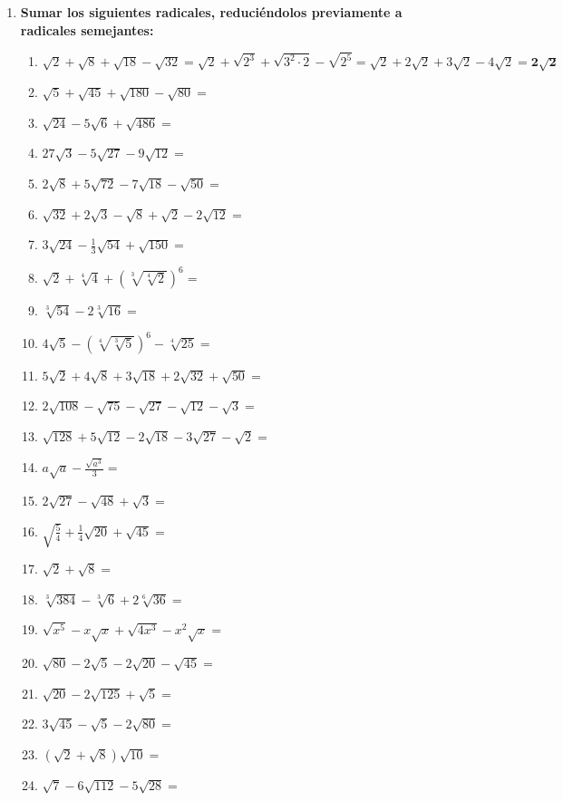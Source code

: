 \documentclass[10pt, a4paper]{article}
\begin{document}
\begin{enumerate}
    \item \textbf{Sumar los siguientes radicales, reduciéndolos previamente a radicales semejantes:}
    \begin{enumerate}[label=\alph*)]
        \item $\sqrt{2} + \sqrt{8} + \sqrt{18} - \sqrt{32} = \sqrt{2} + \sqrt{2^3} + \sqrt{3^2 \cdot 2} - \sqrt{2^5} = \sqrt{2} + 2\sqrt{2} + 3\sqrt{2} - 4\sqrt{2} = \mathbf{2\sqrt{2}}$
        \item $\sqrt{5} + \sqrt{45} + \sqrt{180} - \sqrt{80} =$
        \item $\sqrt{24} - 5\sqrt{6} + \sqrt{486} =$
        \item $27\sqrt{3} - 5\sqrt{27} - 9\sqrt{12} =$
        \item $2\sqrt{8} + 5\sqrt{72} - 7\sqrt{18} - \sqrt{50} =$
        \item $\sqrt{32} + 2\sqrt{3} - \sqrt{8} + \sqrt{2} - 2\sqrt{12} =$
        \item $3\sqrt{24} - \frac{1}{3}\sqrt{54} + \sqrt{150} =$
        \item $\sqrt{2} + \sqrt[4]{4} + (\sqrt[3]{\sqrt[4]{2}})^6 =$
        \item $\sqrt[3]{54} - 2\sqrt[3]{16} =$
        \item $4\sqrt{5} - (\sqrt[4]{\sqrt[3]{5}})^6 - \sqrt[4]{25} =$
        \item $5\sqrt{2} + 4\sqrt{8} + 3\sqrt{18} + 2\sqrt{32} + \sqrt{50} =$
        \item $2\sqrt{108} - \sqrt{75} - \sqrt{27} - \sqrt{12} - \sqrt{3} =$
        \item $\sqrt{128} + 5\sqrt{12} - 2\sqrt{18} - 3\sqrt{27} - \sqrt{2} =$
        \item $a\sqrt{a} - \frac{\sqrt{a^3}}{3} =$
        \item $2\sqrt{27} - \sqrt{48} + \sqrt{3} =$
        \item $\sqrt{\frac{5}{4}} + \frac{1}{4}\sqrt{20} + \sqrt{45} =$
        \item $\sqrt{2} + \sqrt{8} =$
        \item $\sqrt[3]{384} - \sqrt[3]{6} + 2\sqrt[6]{36} =$
        \item $\sqrt{x^5} - x\sqrt{x} + \sqrt{4x^3} - x^2 \sqrt{x} =$
        \item $\sqrt{80} - 2\sqrt{5} - 2\sqrt{20} - \sqrt{45} =$
        \item $\sqrt{20} - 2\sqrt{125} + \sqrt{5} =$
        \item $3\sqrt{45} - \sqrt{5} - 2\sqrt{80} =$
        \item $(\sqrt{2} + \sqrt{8})\sqrt{10} =$
        \item $\sqrt{7} - 6\sqrt{112} - 5\sqrt{28} =$
    \end{enumerate}
\end{enumerate}
\end{document}
